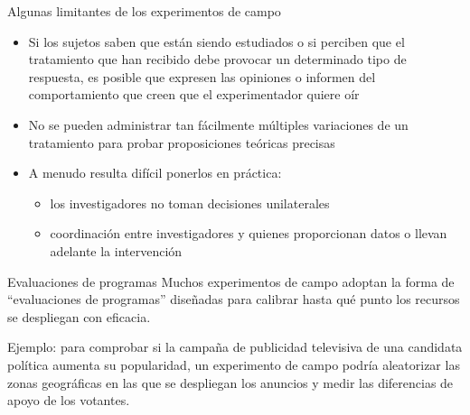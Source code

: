 \documentclass[
  ignorenonframetext,
]{beamer}
\providecommand{\tightlist}{%
  \setlength{\itemsep}{0pt}\setlength{\parskip}{0pt}}
\begin{document}
\begin{frame}{Algunas limitantes de los experimentos de campo}
\protect\hypertarget{algunas-limitantes-de-los-experimentos-de-campo}{}
\begin{itemize}
\tightlist
\item
  Si los sujetos saben que están siendo estudiados o si perciben que el
  tratamiento que han recibido debe provocar un determinado tipo de
  respuesta, es posible que expresen las opiniones o informen del
  comportamiento que creen que el experimentador quiere oír
\item
  No se pueden administrar tan fácilmente múltiples variaciones de un
  tratamiento para probar proposiciones teóricas precisas
\item
  A menudo resulta difícil ponerlos en práctica:

  \begin{itemize}
  \tightlist
  \item
    los investigadores no toman decisiones unilaterales
  \item
    coordinación entre investigadores y quienes proporcionan datos o
    llevan adelante la intervención
  \end{itemize}
\end{itemize}
\end{frame}

\begin{frame}{Evaluaciones de programas}
\protect\hypertarget{evaluaciones-de-programas}{}
Muchos experimentos de campo adoptan la forma de ``evaluaciones de
programas'' diseñadas para calibrar hasta qué punto los recursos se
despliegan con eficacia.

Ejemplo: para comprobar si la campaña de publicidad televisiva de una
candidata política aumenta su popularidad, un experimento de campo
podría aleatorizar las zonas geográficas en las que se despliegan los
anuncios y medir las diferencias de apoyo de los votantes.
\end{frame}

\end{document}
